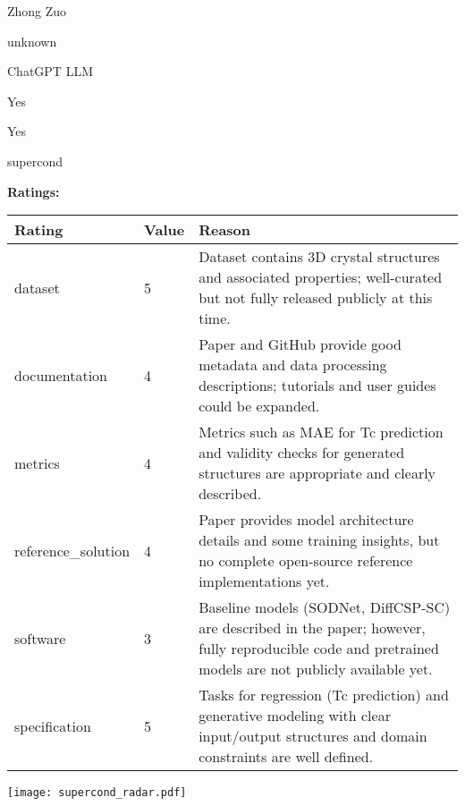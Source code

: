 {{\begin{description}[labelwidth=4cm, labelsep=1em, leftmargin=4cm, itemsep=0.1em, parsep=0em]
  \item[contact.name:] Zhong Zuo
  \item[contact.email:] unknown
  \item[results.links.name:] ChatGPT LLM
  \item[fair.reproducible:] Yes
  \item[fair.benchmark\_ready:] Yes
  \item[id:] supercond
  \item[Citations:] \cite{neurips2024_c4e3b55e}
\end{description}

{\bf Ratings:} ~ \\

\begin{tabular}{p{} p{} p{}}
\hline
Rating & Value & Reason \\
\hline
dataset & 5 & Dataset contains 3D crystal structures and associated properties; well-curated but
not fully released publicly at this time.
 \\
documentation & 4 & Paper and GitHub provide good metadata and data processing descriptions; tutorials
and user guides could be expanded.
 \\
metrics & 4 & Metrics such as MAE for Tc prediction and validity checks for generated structures
are appropriate and clearly described.
 \\
reference\_solution & 4 & Paper provides model architecture details and some training insights, but no
complete open-source reference implementations yet.
 \\
software & 3 & Baseline models (SODNet, DiffCSP-SC) are described in the paper; however,
fully reproducible code and pretrained models are not publicly available yet.
 \\
specification & 5 & Tasks for regression (Tc prediction) and generative modeling with clear input/output
structures and domain constraints are well defined.
 \\
\hline
\end{tabular}

\texttt{[image: supercond\_radar.pdf]}
}}
\clearpage
